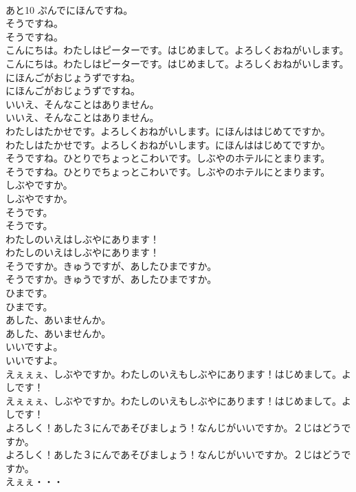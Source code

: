 \documentclass[8pt]{extreport}
\begin{document}
\begin{CJK}{UTF8}{min}
\\	あと10 ぷんでにほんですね。 
\\	そうですね。	
\\	そうですね。 
\\	こんにちは。わたしはピーターです。はじめまして。よろしくおねがいします。	
\\	こんにちは。わたしはピーターです。はじめまして。よろしくおねがいします。 
\\	にほんごがおじょうずですね。	
\\	にほんごがおじょうずですね。 
\\	いいえ、そんなことはありません。	
\\	いいえ、そんなことはありません。 
\\	わたしはたかせです。よろしくおねがいします。にほんははじめてですか。	
\\	わたしはたかせです。よろしくおねがいします。にほんははじめてですか。 
\\	そうですね。ひとりでちょっとこわいです。しぶやのホテルにとまります。	
\\	そうですね。ひとりでちょっとこわいです。しぶやのホテルにとまります。 
\\	しぶやですか。	
\\	しぶやですか。 
\\	そうです。	
\\	そうです。 
\\	わたしのいえはしぶやにあります！	
\\	わたしのいえはしぶやにあります！ 
\\	そうですか。きゅうですが、あしたひまですか。	
\\	そうですか。きゅうですが、あしたひまですか。 
\\	ひまです。	
\\	ひまです。 
\\	あした、あいませんか。	
\\	あした、あいませんか。 
\\	いいですよ。	
\\	いいですよ。 
\\	えぇぇぇ、しぶやですか。わたしのいえもしぶやにあります！はじめまして。よしです！	
\\	えぇぇぇ、しぶやですか。わたしのいえもしぶやにあります！はじめまして。よしです！ 
\\	よろしく！あした３にんであそびましょう！なんじがいいですか。２じはどうですか。	
\\	よろしく！あした３にんであそびましょう！なんじがいいですか。２じはどうですか。 
\\	えぇぇ・・・	

\end{CJK}
\end{document}
